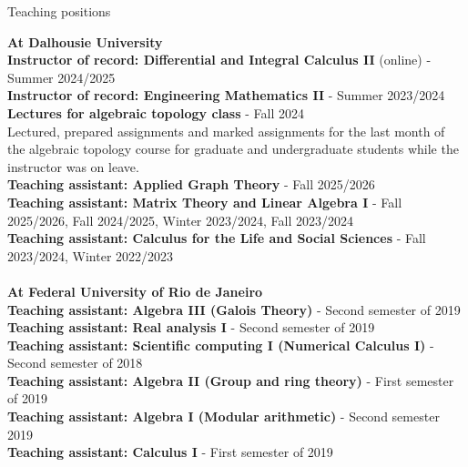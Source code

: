 \documentclass[12pt]{resume} %
\begin{document}
\begin{rSection}{Teaching positions}

{\bf \large{At Dalhousie University}}
    \\[1mm]
    {\bf Instructor of record: Differential and Integral Calculus II} (online) - Summer 2024/2025
    \\
    {\bf Instructor of record: Engineering Mathematics II} - Summer 2023/2024
    \\
    {\bf Lectures for algebraic topology class} - Fall 2024
    \\
    Lectured, prepared assignments and marked assignments for the last month of the algebraic topology course for graduate and undergraduate students while the instructor was on leave.
    \\
    {\bf Teaching assistant: Applied Graph Theory} - Fall 2025/2026 
    \\
    {\bf Teaching assistant: Matrix Theory and Linear Algebra I} - Fall 2025/2026, Fall 2024/2025, Winter 2023/2024, Fall 2023/2024 
    \\
    {\bf Teaching assistant: Calculus for the Life and Social Sciences} - Fall 2023/2024, Winter 2022/2023
    \\
    \\
    {\bf \large{At Federal University of Rio de Janeiro}}
    \\[1mm]
    {\bf Teaching assistant: Algebra III (Galois Theory)} - Second semester of 2019
    \\
    {\bf Teaching assistant: Real analysis I} - Second semester of 2019 
    \\
    {\bf Teaching assistant: Scientific computing I (Numerical Calculus I)} - Second semester of 2018
    \\
    {\bf Teaching assistant: Algebra II (Group and ring theory)} - First semester of 2019
    \\
    {\bf Teaching assistant: Algebra I (Modular arithmetic)} - Second semester 2019
    \\
    {\bf Teaching assistant: Calculus I} - First semester of 2019
\end{rSection}
 
\end{document}
